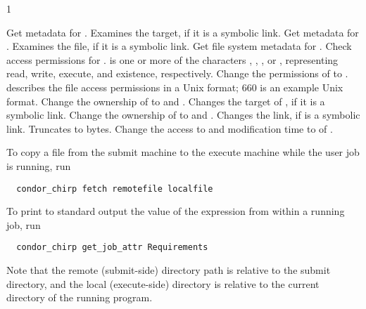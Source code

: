 \begin{ManPage}{\label{man-condor-chirp}}{1}
\begin{description}
    {Get metadata for . Examines the target, 
    if it is a symbolic link.}
    {Get metadata for . Examines the file,
    if it is a symbolic link.}
    {Get file system metadata for .}
    {Check access permissions for . 
     is one or more of the characters , , 
    , or , representing read, write, execute, and 
    existence, respectively.}
    {Change the permissions of  to .
     describes the file access permissions in a Unix format;
    660 is an example Unix format. }
    {Change the ownership of  to  and .
    Changes the target of , if it is a symbolic link.}
    {Change the ownership of  to  and .
    Changes the link, if  is a symbolic link.}
    {Truncates  to  bytes.}
    {Change the access to  and modification time
    to  of .}
\end{description}

\Examples

To copy a file from the submit machine to the execute machine while the 
user job is running, run

\footnotesize
\begin{verbatim}
  condor_chirp fetch remotefile localfile
\end{verbatim}
\normalsize

To print to standard output the value of the 
expression from within a running job, run

\footnotesize
\begin{verbatim}
  condor_chirp get_job_attr Requirements
\end{verbatim}
\normalsize

Note that the remote (submit-side) directory path is relative to the
submit directory, and the local (execute-side) directory is relative to the
current directory of the running program.


\end{ManPage}
